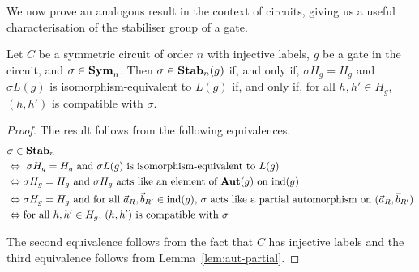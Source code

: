\documentclass[../paper.tex]{subfiles}
\begin{document}
We now prove an analogous result in the context of circuits, giving us a useful
characterisation of the stabiliser group of a gate.

\begin{lem}
  Let $C$ be a symmetric circuit of order $n$ with injective labels, $g$ be a
  gate in the circuit, and $\sigma \in \text{\textbf{Sym}}_n$. Then $\sigma \in \text{\textbf{Stab}}_n(g)$ if,
  and only if, $\sigma H_g = H_g$ and $\sigma L(g)$ is isomorphism-equivalent to
  $L(g)$ if, and only if, for all $h, h' \in H_g$, $(h, h')$ is compatible with
  $\sigma$.
  \label{lem:isostab-compatible}
\end{lem}

\begin{proof}
  The result follows from the following equivalences.
  \begin{align*}
    & \sigma \in \text{\textbf{Stab}}_n\\
    & \Leftrightarrow \text{ $\sigma H_g = H_g$ and $\sigma L(g)$ is
      isomorphism-equivalent to $L(g)$}\\
    & \Leftrightarrow \text{$\sigma H_g = H_g$ and $\sigma H_g$ acts like an
      element of $\text{\textbf{Aut}} (g)$ on $\text{\upshape ind}(g)$} \\
    & \Leftrightarrow \text{$\sigma H_g = H_g$ and for all $\vec{a}_R,
      \vec{b}_{R'} \in \text{\upshape ind}(g)$, $\sigma$ acts like a partial automorphism on
      $(\vec{a}_R, \vec{b}_{R'})$}\\
    & \Leftrightarrow \text{for all $h, h' \in H_g$, $(h, h')$ is compatible with
      $\sigma$}
  \end{align*}


  The second equivalence follows from the fact that $C$ has injective labels and
  the third equivalence follows from Lemma~\ref{lem:aut-partial}.

\end{proof}
\end{document}
